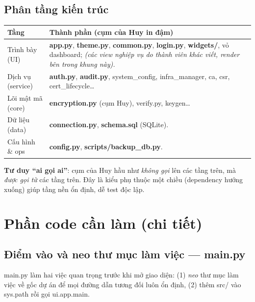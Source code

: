\documentclass[12pt,a4paper]{article}
\newcommand{\code}[1]{{\ttfamily\small\def\_{\textunderscore\discretionary{}{}{}}#1}}
\begin{document}
\subsection{Phân tầng kiến trúc}

\renewcommand{\arraystretch}{1.3}
\begin{tabularx}{\linewidth}{L{3.2cm} X}
\toprule
\textbf{Tầng} & \textbf{Thành phần (cụm của Huy in đậm)} \\
\midrule
Trình bày (UI) & \textbf{app.py}, \textbf{theme.py}, \textbf{common.py},
\textbf{login.py}, \textbf{widgets/}, vỏ dashboard; \emph{(các view nghiệp vụ do
thành viên khác viết, render bên trong khung này).} \\
Dịch vụ (service) & \textbf{auth.py}, \textbf{audit.py}, system\_config,
infra\_manager, ca, csr, cert\_lifecycle\dots \\
Lõi mật mã (core) & \textbf{encryption.py} (cụm Huy), verify.py, keygen\dots \\
Dữ liệu (data) & \textbf{connection.py}, \textbf{schema.sql} (SQLite). \\
Cấu hình \& ops & \textbf{config.py}, \textbf{scripts/backup\_db.py}. \\
\bottomrule
\end{tabularx}

\begin{notebox}
\textbf{Tư duy ``ai gọi ai''}: cụm của Huy hầu như \emph{không gọi} lên các tầng
trên, mà \emph{được gọi từ} các tầng trên. Đây là kiểu phụ thuộc một chiều
(dependency hướng xuống) giúp tầng nền ổn định, dễ test độc lập.
\end{notebox}

\section{Phần code cần làm (chi tiết)}

\subsection{Điểm vào và neo thư mục làm việc — \code{main.py}}

\code{main.py} làm hai việc quan trọng trước khi mở giao diện: (1) \emph{neo} thư
mục làm việc về gốc dự án để mọi đường dẫn tương đối luôn ổn định, (2) thêm
\code{src/} vào \code{sys.path} rồi gọi \code{ui.app.main}.
\end{document}
